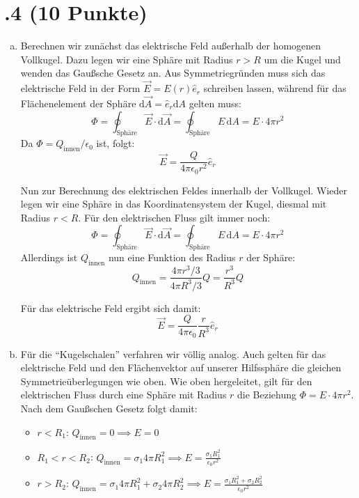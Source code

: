 \section*{\nr.4 \titfour (10 Punkte)}
\begin{enumerate}[(a)]
\item Berechnen wir zunächst das elektrische Feld außerhalb der homogenen Vollkugel. Dazu legen wir eine Sphäre mit Radius $r>R$ um die Kugel und wenden das Gaußsche Gesetz an. Aus Symmetriegründen muss sich das elektrische Feld in der Form $\vec{E}=E(r)\hat{e}_r$ schreiben lassen, während für das Flächenelement der Sphäre $\mathrm{d}\vec{A}=\hat{e}_r \mathrm{d}A$ gelten muss:
\begin{equation}
\Phi = \oint_{\text{Sphäre}}\vec{E}\cdot\mathrm{d}\vec{A}= \oint_{\text{Sphäre}}E\, \mathrm{d}A = E\cdot 4\pi r^2
\end{equation}
Da $\Phi= Q_\text{innen}/\epsilon_0$ ist, folgt:
\begin{equation}
\vec{E}=\frac{Q}{4\pi\epsilon_0r^2}\hat{e}_r
\end{equation}

Nun zur Berechnung des elektrischen Feldes innerhalb der Vollkugel. Wieder legen wir eine Sphäre in das Koordinatensystem der Kugel, diesmal mit Radius $r<R$. Für den elektrischen Fluss gilt immer noch:
\begin{equation}
\Phi = \oint_{\text{Sphäre}}\vec{E}\cdot\mathrm{d}\vec{A}= \oint_{\text{Sphäre}}E\, \mathrm{d}A = E\cdot 4\pi r^2
\end{equation}
Allerdings ist  $Q_\text{innen}$ nun eine Funktion des Radius $r$ der Sphäre:
\begin{equation}
Q_\text{innen} = \frac{4\pi r^3 /3}{4\pi R^3/3} Q= \frac{r^3}{R^3}Q
\end{equation} 

Für das elektrische Feld ergibt sich damit:
\begin{equation}
\vec{E}=\frac{Q}{4\pi\epsilon_0}\frac{r}{R^3}\hat{e}_r
\end{equation}

\item Für die "`Kugelschalen"' verfahren wir völlig analog. Auch gelten für das elektrische Feld und den Flächenvektor auf unserer Hilfssphäre die gleichen Symmetrieüberlegungen wie oben. Wie oben hergeleitet, gilt für den elektrischen Fluss durch eine Sphäre mit Radius $r$ die Beziehung $\Phi= E\cdot 4\pi r^2$. Nach dem Gaußschen Gesetz folgt damit:
\begin{itemize}
\item $r<R_1$: $Q_\text{innen}=0 \implies E=0$
\item $R_1<r<R_2$: $Q_\text{innen}=\sigma_1 4\pi R_1^2 \implies E =\frac{\sigma_1 R_1^2}{\epsilon_0 r^2}$
\item $r>R_2$: $Q_\text{innen}=\sigma_1 4\pi R_1^2 + \sigma_2 4\pi R_2^2 \implies E =\frac{\sigma_1 R_1^2+\sigma_2 R_2^2}{\epsilon_0 r^2}$
\end{itemize}


\end{enumerate}
